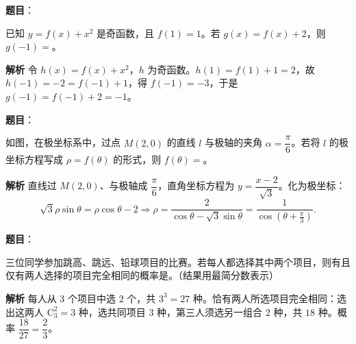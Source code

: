 \begin{answer}

\textbf{题目}：

已知 $y=f(x)+x^2$ 是奇函数，且 $f(1)=1$。若 $g(x)=f(x)+2$，则 $g(-1)=$\gkblank{}。

\textbf{解析}
令 $h(x)=f(x)+x^2$，$h$ 为奇函数。$h(1)=f(1)+1=2$，故 $h(-1)=-2=f(-1)+1$，得 $f(-1)=-3$，于是 $g(-1)=f(-1)+2=-1$。


\end{answer}
\begin{answer}

\textbf{题目}：

如图，在极坐标系中，过点 $M(2,0)$ 的直线 $l$ 与极轴的夹角 $\alpha=\dfrac\pi6$。若将 $l$ 的极坐标方程写成 $\rho=f(\theta)$ 的形式，则 $f(\theta)=$\gkblank{}。
\nopagebreak[4]
\begin{center}\end{center}
\nopagebreak[4]
\textbf{解析}
直线过 $M(2,0)$、与极轴成 $\dfrac\pi6$，直角坐标方程为 $y=\dfrac{x-2}{\sqrt3}$。化为极坐标：
\nopagebreak[4]
\[\sqrt3\rho\sin\theta=\rho\cos\theta-2\Longrightarrow\rho=\frac2{\cos\theta-\sqrt3\sin\theta}=\frac1{\cos\left(\theta+\frac\pi3\right)}.\]


\end{answer}
\begin{answer}

\textbf{题目}：

三位同学参加跳高、跳远、铅球项目的比赛。若每人都选择其中两个项目，则有且仅有两人选择的项目完全相同的概率是\gkblank{}。（结果用最简分数表示）

\textbf{解析}
每人从 $3$ 个项目中选 $2$ 个，共 $3^3=27$ 种。恰有两人所选项目完全相同：选出这两人 $\mathrm C_3^2=3$ 种，选共同项目 $3$ 种，第三人须选另一组合 $2$ 种，共 $18$ 种。概率 $\dfrac{18}{27}=\dfrac23$。


\end{answer}
